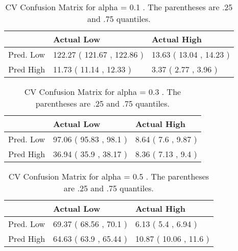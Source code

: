 \begin{table}[H]
\begin{center}
\begin{tabular}{rll}
  \hline
 & Actual Low & Actual High \\ 
  \hline
Pred. Low & 122.27 ( 121.67 , 122.86 ) & 13.63 ( 13.04 , 14.23 ) \\ 
  Pred High & 11.73 ( 11.14 , 12.33 ) & 3.37 ( 2.77 , 3.96 ) \\ 
   \hline
\end{tabular}
\caption{CV Confusion Matrix for alpha = 0.1 . The parentheses are .25 and .75 quantiles.}
\end{center}
\end{table}
\begin{table}[H]
\begin{center}
\begin{tabular}{rll}
  \hline
 & Actual Low & Actual High \\ 
  \hline
Pred. Low & 97.06 ( 95.83 , 98.1 ) & 8.64 ( 7.6 , 9.87 ) \\ 
  Pred High & 36.94 ( 35.9 , 38.17 ) & 8.36 ( 7.13 , 9.4 ) \\ 
   \hline
\end{tabular}
\caption{CV Confusion Matrix for alpha = 0.3 . The parentheses are .25 and .75 quantiles.}
\end{center}
\end{table}
\begin{table}[H]
\begin{center}
\begin{tabular}{rll}
  \hline
 & Actual Low & Actual High \\ 
  \hline
Pred. Low & 69.37 ( 68.56 , 70.1 ) & 6.13 ( 5.4 , 6.94 ) \\ 
  Pred High & 64.63 ( 63.9 , 65.44 ) & 10.87 ( 10.06 , 11.6 ) \\ 
   \hline
\end{tabular}
\caption{CV Confusion Matrix for alpha = 0.5 . The parentheses are .25 and .75 quantiles.}
\end{center}
\end{table}
